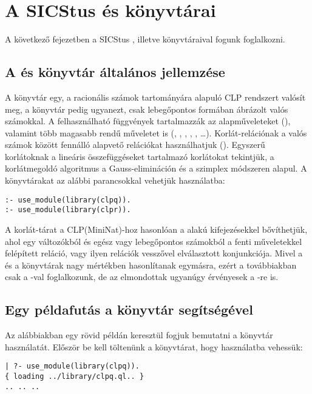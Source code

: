 \clearpage

\chapter{A SICStus \clpq és \clpr könyvtárai}

A következő fejezetben a SICStus \clpq, illetve \clpr könyvtáraival
fogunk foglalkozni.

\section{A \clpq és \clpr könyvtár általános jellemzése}

A \clpq könyvtár egy, a racionális számok tartományára
alapuló CLP rendszert valósít meg, a \clpr könyvtár pedig ugyanezt, csak
lebegőpontos formában ábrázolt valós számokkal. A felhasználható függvények
tartalmazzák az alapműveleteket (\cd{+ - * /}), valamint több magasabb rendű
műveletet is (, , , , , \ldots).
Korlát-relációnak a valós számok között fennálló alapvető relációkat
használhatjuk (\cd{= =:= < > =< >= =\bs=}). Egyszerű korlátoknak a lineáris
összefüggéseket tartalmazó korlátokat tekintjük, a korlátmegoldó algoritmus
a Gauss-elimináción és a szimplex módszeren alapul. A könyvtárakat az alábbi
parancsokkal vehetjük használatba:

\begin{verbatim}
:- use_module(library(clpq)).
:- use_module(library(clpr)).
\end{verbatim}

A korlát-tárat a CLP(MiniNat)-hoz hasonlóan a  alakú
kifejezésekkel bővíthetjük, ahol  egy változókból és egész vagy
lebegőpontos számokból a fenti műveletekkel felépített reláció, vagy
ilyen relációk vesszővel elválasztott konjunkciója.
\br
Mivel a \clpq és a \clpr könyvtárak nagy mértékben hasonlítanak
egymásra, ezért a továbbiakban csak a \Clpq-val foglalkozunk, de az
elmondottak ugyanúgy érvényesek a \Clpr-re is.

\section{Egy példafutás a \clpq könyvtár segítségével}

Az alábbiakban egy rövid példán keresztül fogjuk bemutatni a \clpq
könyvtár használatát.
\br
Először be kell töltenünk a \clpq könyvtárat, hogy használatba vehessük:

\begin{verbatim}
| ?- use_module(library(clpq)).
{ loading ../library/clpq.ql.. }
.. .. ..
\end{verbatim}

